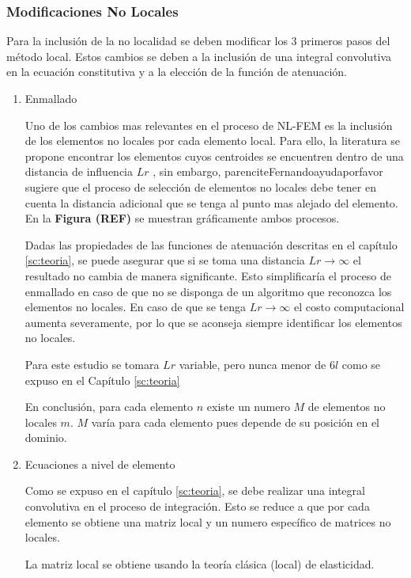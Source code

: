 		\subsubsection{Modificaciones No Locales}
		Para la inclusión de la no localidad se deben modificar los 3 primeros pasos del método local. Estos cambios se deben a la inclusión de una integral convolutiva en la ecuación constitutiva y a la elección de la función de atenuación.
			\begin{enumerate}
				\item Enmallado

				Uno de los cambios mas relevantes en el proceso de NL-FEM es la inclusión de los elementos no locales por cada elemento local. Para ello, la literatura se propone encontrar los elementos cuyos centroides se encuentren dentro de una distancia de influencia $Lr$ \parencite{article}, sin embargo, parencite{Fernandoayudaporfavor} sugiere que el proceso de selección de elementos no locales debe tener en cuenta la distancia adicional que se tenga al punto mas alejado del elemento. En la \textbf{Figura (REF)} se muestran gráficamente ambos procesos.

				Dadas las propiedades de las funciones de atenuación descritas en el capítulo \ref{sc:teoria}, se puede asegurar que si se toma una distancia $Lr\rightarrow\infty$ el resultado no cambia de manera significante. Esto simplificaría el proceso de enmallado en caso de que no se disponga de un algoritmo que reconozca los elementos no locales. En caso de que se tenga $Lr\rightarrow\infty$ el costo computacional aumenta severamente, por lo que se aconseja siempre identificar los elementos no locales.

				Para este estudio se tomara $Lr$ variable, pero nunca menor de $6l$ como se expuso en el Capítulo \ref{sc:teoria}

				En conclusión, para cada elemento $n$ existe un numero $M$ de elementos no locales $m$. $M$ varía para cada elemento pues depende de su posición en el dominio.
				\item Ecuaciones a nivel de elemento

				Como se expuso en el capítulo \ref{sc:teoria}, se debe realizar una integral convolutiva en el proceso de integración. Esto se reduce a que por cada elemento se obtiene una matriz local y un numero específico de matrices no locales.

				La matriz local se obtiene usando la teoría clásica (local) de elasticidad.


\end{enumerate}

